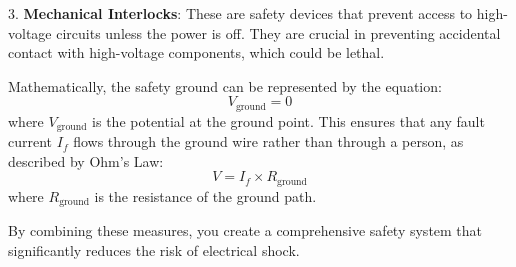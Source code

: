 3. \textbf{Mechanical Interlocks}: These are safety devices that prevent access to high-voltage circuits unless the power is off. They are crucial in preventing accidental contact with high-voltage components, which could be lethal.

Mathematically, the safety ground can be represented by the equation:
\[
V_{\text{ground}} = 0
\]
where \( V_{\text{ground}} \) is the potential at the ground point. This ensures that any fault current \( I_f \) flows through the ground wire rather than through a person, as described by Ohm's Law:
\[
V = I_f \times R_{\text{ground}}
\]
where \( R_{\text{ground}} \) is the resistance of the ground path.

By combining these measures, you create a comprehensive safety system that significantly reduces the risk of electrical shock.

